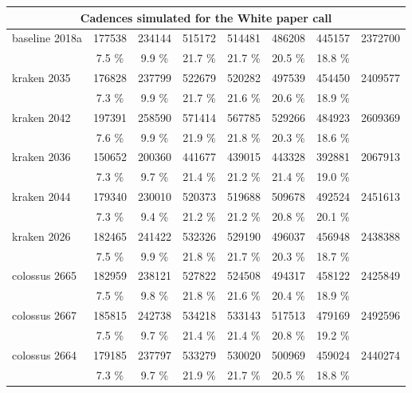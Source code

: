 \documentclass [11pt,a4paper]{article}
\begin{document}
\begin{appendices}
\begin{longtable}{l|ccccccc}
  \hline
  \hline
  \multicolumn{8}{c}{Cadences simulated for the White paper call}\\
  \hline      
      baseline 2018a &  177538 &  234144 &  515172 &  514481 &  486208 &  445157 &  2372700 \\ 
                     &    7.5 \% &    9.9 \% &   21.7 \% &   21.7 \% &   20.5 \% &   18.8 \% & \\
\hline
         kraken 2035 &  176828 &  237799 &  522679 &  520282 &  497539 &  454450 &  2409577 \\ 
                     &    7.3 \% &    9.9 \% &   21.7 \% &   21.6 \% &   20.6 \% &   18.9 \% & \\
\hline         
         kraken 2042 &  197391 &  258590 &  571414 &  567785 &  529266 &  484923 &  2609369 \\ 
                     &    7.6 \% &    9.9 \% &   21.9 \% &   21.8 \% &   20.3 \% &   18.6 \% & \\
\hline
         kraken 2036 &  150652 &  200360 &  441677 &  439015 &  443328 &  392881 &  2067913 \\ 
                     &    7.3 \% &    9.7 \% &   21.4 \% &   21.2 \% &   21.4 \% &   19.0 \% & \\
\hline
         kraken 2044 &  179340 &  230010 &  520373 &  519688 &  509678 &  492524 &  2451613 \\ 
                     &    7.3 \% &    9.4 \% &   21.2 \% &   21.2 \% &   20.8 \% &   20.1 \% & \\
\hline
         kraken 2026 &  182465 &  241422 &  532326 &  529190 &  496037 &  456948 &  2438388 \\ 
                     &    7.5 \% &    9.9 \% &   21.8 \% &   21.7 \% &   20.3 \% &   18.7 \% & \\
\hline
       colossus 2665 &  182959 &  238121 &  527822 &  524508 &  494317 &  458122 &  2425849 \\ 
                     &    7.5 \% &    9.8 \% &   21.8 \% &   21.6 \% &   20.4 \% &   18.9 \% & \\
\hline
       colossus 2667 &  185815 &  242738 &  534218 &  533143 &  517513 &  479169 &  2492596 \\ 
                     &    7.5 \% &    9.7 \% &   21.4 \% &   21.4 \% &   20.8 \% &   19.2 \% & \\
\hline
       colossus 2664 &  179185 &  237797 &  533279 &  530020 &  500969 &  459024 &  2440274 \\ 
                     &    7.3 \% &    9.7 \% &   21.9 \% &   21.7 \% &   20.5 \% &   18.8 \% & \\

\end{longtable}
\end{appendices}
\end{document}
